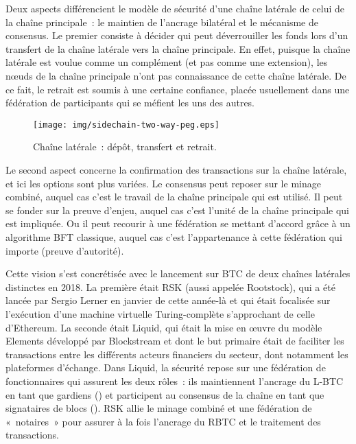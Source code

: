 Deux aspects différencient le modèle de sécurité d'une chaîne latérale de celui de la chaîne principale~: le maintien de l'ancrage bilatéral et le mécanisme de consensus. Le premier consiste à décider qui peut déverrouiller les fonds lors d'un transfert de la chaîne latérale vers la chaîne principale. En effet, puisque la chaîne latérale est voulue comme un complément (et pas comme une extension), les nœuds de la chaîne principale n'ont pas connaissance de cette chaîne latérale. De ce fait, le retrait est soumis à une certaine confiance, placée usuellement dans une fédération de participants qui se méfient les uns des autres.

\begin{figure}[ht]
  \centering
  \texttt{[image: img/sidechain-two-way-peg.eps]}
  \caption{Chaîne latérale~: dépôt, transfert et retrait.}
  \label{fig:sidechain-two-way-peg}
\end{figure}

Le second aspect concerne la confirmation des transactions sur la chaîne latérale, et ici les options sont plus variées. Le consensus peut reposer sur le minage combiné, auquel cas c'est le travail de la chaîne principale qui est utilisé. Il peut se fonder sur la preuve d'enjeu, auquel cas c'est l'unité de la chaîne principale qui est impliquée. Ou il peut recourir à une fédération se mettant d'accord grâce à un algorithme BFT classique, auquel cas c'est l'appartenance à cette fédération qui importe (preuve d'autorité).

Cette vision s'est concrétisée avec le lancement sur BTC de deux chaînes latérales distinctes en 2018. La première était RSK (aussi appelée Rootstock), qui a été lancée par Sergio Lerner en janvier de cette année-là et qui était focalisée sur l'exécution d'une machine virtuelle Turing-complète s'approchant de celle d'Ethereum. La seconde était Liquid, qui était la mise en œuvre du modèle Elements développé par Blockstream et dont le but primaire était de faciliter les transactions entre les différents acteurs financiers du secteur, dont notamment les plateformes d'échange. Dans Liquid, la sécurité repose sur une fédération de fonctionnaires qui assurent les deux rôles~: ils maintiennent l'ancrage du L-BTC en tant que gardiens () et participent au consensus de la chaîne en tant que signataires de blocs (). RSK allie le minage combiné et une fédération de «~notaires~» pour assurer à la fois l'ancrage du RBTC et le traitement des transactions.

